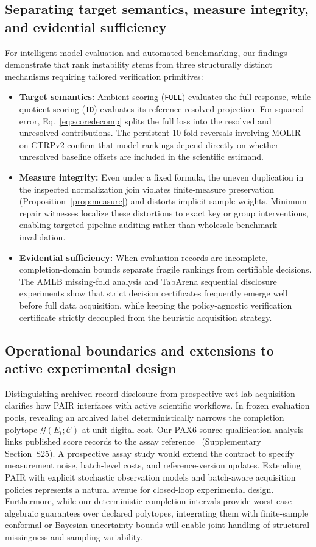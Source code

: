 \documentclass[preprint,12pt,number,sort&compress]{elsarticle}
\newcommand{\method}{PAIR\xspace}
\begin{document}
\subsection{Separating target semantics, measure integrity, and evidential sufficiency}
For intelligent model evaluation and automated benchmarking, our findings demonstrate that rank instability stems from three structurally distinct mechanisms requiring tailored verification primitives:
\begin{itemize}
\item \textbf{Target semantics:} Ambient scoring (\texttt{FULL}) evaluates the full response, while quotient scoring (\texttt{ID}) evaluates its reference-resolved projection. For squared error, Eq.~\eqref{eq:scoredecomp} splits the full loss into the resolved and unresolved contributions. The persistent $10$-fold reversals involving MOLIR on CTRPv2 confirm that model rankings depend directly on whether unresolved baseline offsets are included in the scientific estimand.
\item \textbf{Measure integrity:} Even under a fixed formula, the uneven duplication in the inspected normalization join violates finite-measure preservation (Proposition~\ref{prop:measure}) and distorts implicit sample weights. Minimum repair witnesses localize these distortions to exact key or group interventions, enabling targeted pipeline auditing rather than wholesale benchmark invalidation.
\item \textbf{Evidential sufficiency:} When evaluation records are incomplete, completion-domain bounds separate fragile rankings from certifiable decisions. The AMLB missing-fold analysis and TabArena sequential disclosure experiments show that strict decision certificates frequently emerge well before full data acquisition, while keeping the policy-agnostic verification certificate strictly decoupled from the heuristic acquisition strategy.
\end{itemize}

\subsection{Operational boundaries and extensions to active experimental design}
Distinguishing archived-record disclosure from prospective wet-lab acquisition clarifies how \method interfaces with active scientific workflows. In frozen evaluation pools, revealing an archived label deterministically narrows the completion polytope $\mathcal{G}(E_t;\mathcal{C})$ at unit digital cost. Our PAX6 source-qualification analysis links published score records to the assay reference~\cite{mcdonnell2024pax6} (Supplementary Section~S25). A prospective assay study would extend the contract to specify measurement noise, batch-level costs, and reference-version updates. Extending \method with explicit stochastic observation models and batch-aware acquisition policies represents a natural avenue for closed-loop experimental design. Furthermore, while our deterministic completion intervals provide worst-case algebraic guarantees over declared polytopes, integrating them with finite-sample conformal or Bayesian uncertainty bounds will enable joint handling of structural missingness and sampling variability.
\end{document}
